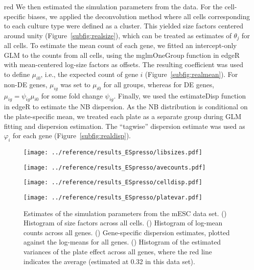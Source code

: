 \documentclass{article}
\begin{document}
\begin{color}{red}
We then estimated the simulation parameters from the data.
For the cell-specific biases, we applied the deconvolution method \citep{lun2016pooling} where all cells corresponding to each culture type were defined as a cluster.
This yielded size factors centered around unity (Figure~\ref{subfig:realsize}), which can be treated as estimates of $\theta_j$ for all cells.
To estimate the mean count of each gene, we fitted an intercept-only GLM to the counts from all cells, using the mglmOneGroup function in edgeR with mean-centered log-size factors as offsets.
The resulting coefficient was used to define $\mu_{i0}$, i.e., the expected count of gene $i$ (Figure~\ref{subfig:realmean}).
For non-DE genes, $\mu_{ig}$ was set to $\mu_{i0}$ for all groups, whereas for DE genes, $\mu_{ig} = \psi_{ig}\mu_{i0}$ for some fold change $\psi_{ig}$.
Finally, we used the estimateDisp function in edgeR to estimate the NB dispersion.
As the NB distribution is conditional on the plate-specific mean, we treated each plate as a separate group during GLM fitting and dispersion estimation.
The ``tagwise'' dispersion estimate was used as $\varphi_i$ for each gene (Figure~\ref{subfig:realdisp}).

\begin{figure}[p]
    \begin{minipage}{0.49\textwidth}
        \texttt{[image: ../reference/results\_ESpresso/libsizes.pdf]}
        \subcaption[]{}
        \label{subfig:realsize}
    \end{minipage}
    \begin{minipage}{0.49\textwidth}
        \texttt{[image: ../reference/results\_ESpresso/avecounts.pdf]}
        \subcaption[]{}
        \label{subfig:realmean}
    \end{minipage}
    \begin{minipage}{0.49\textwidth}
        \texttt{[image: ../reference/results\_ESpresso/celldisp.pdf]}
        \subcaption[]{}
        \label{subfig:realdisp}
    \end{minipage}
    \begin{minipage}{0.49\textwidth}
        \texttt{[image: ../reference/results\_ESpresso/platevar.pdf]}
        \subcaption[]{}
        \label{subfig:realplate}
    \end{minipage}
    \caption{Estimates of the simulation parameters from the mESC data set.
        () Histogram of size factors across all cells.
        () Histogram of log-mean counts across all genes.
        () Gene-specific dispersion estimates, plotted against the log-means for all genes.
        () Histogram of the estimated variances of the plate effect across all genes, where the red line indicates the average (estimated at 0.32 in this data set).
    }
\end{figure}


\end{color}
\end{document}
